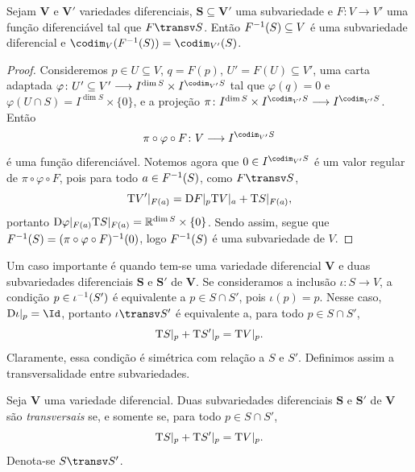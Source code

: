 \begin{prop}
Sejam $\bm V$ e $\bm V'$ variedades diferenciais, $\bm S \subseteq \bm V'$ uma subvariedade e $F\colon V \to V'$ uma função diferenciável tal que $F \transv S$. Então $F^{-1}(S) \subseteq V$ é uma subvariedade diferencial e $\codim_V(F\inv(S)) = \codim_{V'}(S)$.
\end{prop}
\begin{proof}
Consideremos $p \in U \subseteq V$, $q=F(p)$, $U'=F(U) \subseteq V'$, uma carta adaptada $\varphi\colon U' \subseteq V' \to I^{\dim S} \times I^{\codim_{V'} S}$ tal que $\varphi(q)=0$ e $\varphi(U \cap S) = I^{\dim S} \times \{0\}$, e a projeção $\pi\colon I^{\dim S} \times I^{\codim_{V'} S} \to I^{\codim_{V'} S}$. Então
	\begin{equation*}
	\pi \circ \varphi \circ F\colon V \to I^{\codim_{V'} S}
	\end{equation*}
é uma função diferenciável. Notemos agora que $0 \in I^{\codim_{V'} S}$ é um valor regular de $\pi \circ \varphi \circ F$, pois para todo $a \in F^{-1}(S)$, como $F \transv S$,
	\begin{equation*}
	\mathrm{T} V'|_{F(a)} = \mathrm{D} F|_p \mathrm{T} V|_a + \mathrm{T} S|_{F(a)},
	\end{equation*}
portanto $\mathrm{D} \varphi|_{F(a)} \mathrm{T} S|_{F(a)} = \mathbb{R}^{\dim S} \times \{0\}$. Sendo assim, segue que $F^{-1}(S) = (\pi \circ \varphi \circ F)^{-1}(0)$, logo $F^{-1}(S)$ é uma subvariedade de $V$.
\end{proof}

Um caso importante é quando tem-se uma variedade diferencial $\bm V$ e duas subvariedades diferenciais $\bm S$ e $\bm S'$ de $\bm V$. Se consideramos a inclusão $\iota\colon S \to V$, a condição $p \in \iota^{-1}(S')$ é equivalente a $p \in S \cap S'$, pois $\iota(p)=p$. Nesse caso, $\D\iota|_p=\Id$, portanto $\iota \transv S'$ é equivalente a, para todo $p \in S \cap S'$,
	\begin{equation*}
	\mathrm{T} S|_p + \mathrm{T} S'|_{p} = \mathrm{T} V|_{p}.
	\end{equation*}
Claramente, essa condição é simétrica com relação a $S$ e $S'$. Definimos assim a transversalidade entre subvariedades.

\begin{defi}
Seja $\bm V$ uma variedade diferencial. Duas subvariedades diferenciais $\bm S$ e $\bm S'$ de $\bm V$ são \emph{transversais} se, e somente se, para todo $p \in S \cap S'$,
	\begin{equation*}
	\mathrm{T} S|_p + \mathrm{T} S'|_{p} = \mathrm{T} V|_{p}.
	\end{equation*}
Denota-se $S \transv S'$.
\end{defi}


